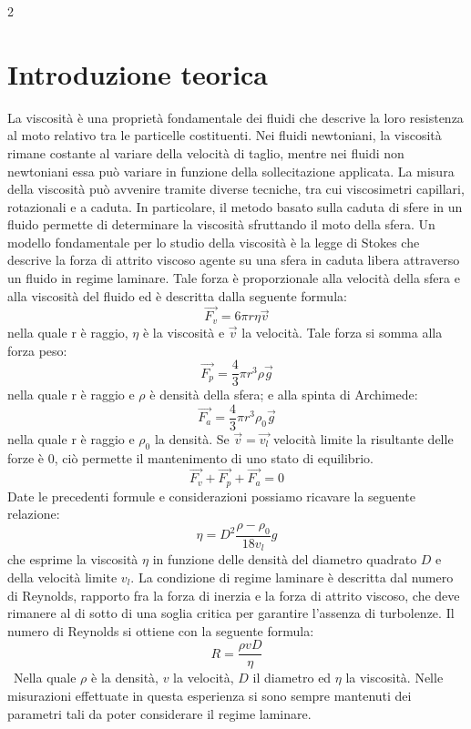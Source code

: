 \documentclass{article}
\begin{document}
\begin{multicols}{2}
\section{Introduzione teorica}
La viscosità è una proprietà fondamentale dei fluidi che descrive la loro resistenza al moto relativo tra le particelle costituenti. Nei fluidi newtoniani, la viscosità rimane costante al variare della velocità di taglio, mentre nei fluidi non newtoniani essa può variare in funzione della sollecitazione applicata.
La misura della viscosità può avvenire tramite diverse tecniche, tra cui viscosimetri capillari, rotazionali e a caduta. In particolare, il metodo basato sulla caduta di sfere in un fluido permette di determinare la viscosità sfruttando il moto della sfera. Un modello fondamentale per lo studio della viscosità è la legge di Stokes che descrive la forza di attrito viscoso agente su una sfera in caduta libera attraverso un fluido in regime laminare. Tale forza è proporzionale alla velocità della sfera e alla viscosità del fluido ed è descritta dalla seguente formula:
\begin{equation}
    \vec{F_v}=6\pi r\eta \vec{v}
\end{equation}
nella quale r è raggio, $\eta$ è la viscosità e $\vec{v}$ la velocità. Tale forza si somma alla forza peso:
\begin{equation}
    \vec{F_p}=\frac{4}{3}\pi r^3 \rho \vec{g}
\end{equation}
nella quale r è raggio e $\rho$ è densità della sfera; e alla spinta di Archimede:
\begin{equation} 
    \vec{F_a}=\frac{4}{3}\pi r^3\rho_0 \vec{g}
\end{equation}
nella quale r è raggio e $\rho_0$ la densità. Se $\vec{v}=\vec{v_l}$ velocità limite la risultante delle forze è 0, ciò permette il mantenimento di uno stato di equilibrio. 
\[
\vec{F_v}+\vec{F_p}+\vec{F_a}=0
\]
Date le precedenti formule e considerazioni possiamo ricavare la seguente relazione:
\begin{equation}
    \eta= D^2\frac{\rho- \rho_0}{18 v_l}g
\end{equation}
che esprime la viscosità $\eta$ in funzione delle densità del diametro quadrato $D$ e della velocità limite $v_l$. La condizione di regime laminare è descritta dal numero di Reynolds, rapporto fra la forza di inerzia e la forza di attrito viscoso, che deve rimanere al di sotto di una soglia critica per garantire l'assenza di turbolenze. Il numero di Reynolds si ottiene con la seguente formula:
\[
R=\frac{\rho vD}{\eta}
\]
\
Nella quale $\rho$ è la densità, $v$ la velocità, $D$ il diametro ed $\eta$ la viscosità. Nelle misurazioni effettuate in questa esperienza si sono sempre mantenuti dei parametri tali da poter considerare il regime laminare.

\end{multicols}
\end{document}
